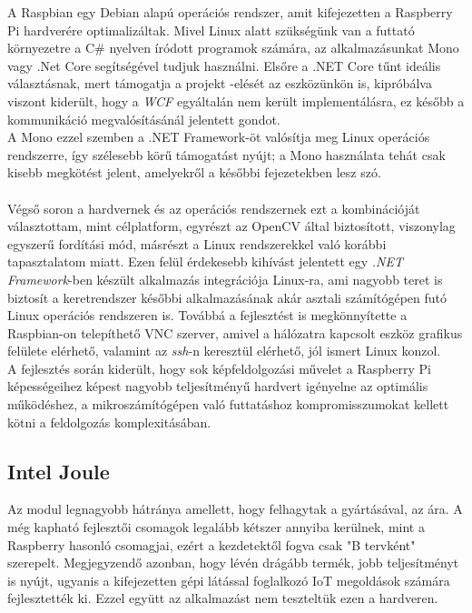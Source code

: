 A Raspbian egy Debian alapú operációs rendszer, amit kifejezetten a Raspberry Pi hardverére optimalizáltak. Mivel Linux alatt szükségünk van a futtató környezetre a C\# nyelven íródott programok számára, az alkalmazásunkat Mono vagy .Net Core segítségével tudjuk használni. Elsőre a .NET Core tűnt ideális választásnak, mert támogatja a projekt -elését az eszközünkön is, kipróbálva viszont kiderült, hogy a \emph{WCF} egyáltalán nem került implementálásra, ez később a kommunikáció megvalósításánál jelentett gondot. \\
A Mono ezzel szemben a .NET Framework-öt valósítja meg Linux operációs rendszerre, így szélesebb körű támogatást nyújt; a Mono használata tehát csak kisebb megkötést jelent, amelyekről a későbbi fejezetekben lesz szó.\\
\\
Végső soron a hardvernek és az operációs rendszernek ezt a kombinációját választottam, mint célplatform, egyrészt az OpenCV által biztosított, viszonylag egyszerű fordítási mód, másrészt a Linux rendszerekkel való korábbi tapasztalatom miatt. Ezen felül érdekesebb kihívást jelentett egy \textit{.NET Framework}-ben készült alkalmazás integrációja Linux-ra, ami nagyobb teret is biztosít a keretrendszer későbbi alkalmazásának akár asztali számítógépen futó Linux operációs rendszeren is. Továbbá a fejlesztést is megkönnyítette a Raspbian-on telepíthető VNC szerver, amivel a hálózatra kapcsolt eszköz grafikus felülete elérhető, valamint az \emph{ssh}-n keresztül elérhető, jól ismert Linux konzol.\\
A fejlesztés során kiderült, hogy sok képfeldolgozási művelet a Raspberry Pi képességeihez képest nagyobb teljesítményű hardvert igényelne az optimális működéshez, a mikroszámítógépen való futtatáshoz kompromisszumokat kellett kötni a feldolgozás komplexitásában.

\subsection{Intel Joule}

Az modul legnagyobb hátránya amellett, hogy felhagytak a gyártásával, az ára. A még kapható fejlesztői csomagok legalább kétszer annyiba kerülnek, mint a Raspberry hasonló csomagjai, ezért a kezdetektől fogva csak "B tervként" szerepelt. Megjegyzendő azonban, hogy lévén drágább termék, jobb teljesítményt is nyújt, ugyanis a kifejezetten gépi látással foglalkozó IoT megoldások számára fejlesztették ki. Ezzel együtt az alkalmazást nem teszteltük ezen a hardveren.

